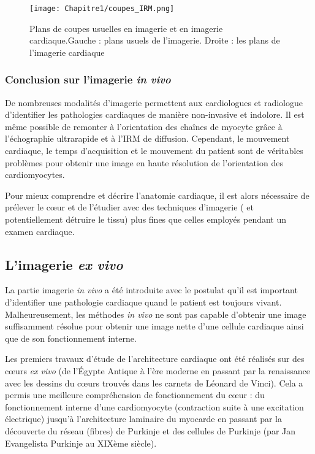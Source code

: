 \begin{figure}[!htbp]
  \begin{center}
    \texttt{[image: Chapitre1/coupes\_IRM.png]}
     \end{center}
    \caption{Plans de coupes usuelles en imagerie et en imagerie cardiaque.Gauche : plans usuels de l'imagerie. Droite : les plans de l'imagerie cardiaque}
  \label{fig:coupes_IRM}
\end{figure}

\subsubsection{Conclusion sur l’imagerie \textit{in vivo}}

De nombreuses modalités d’imagerie permettent aux cardiologues et radiologue d’identifier les pathologies cardiaques de manière non-invasive et indolore. Il est même possible de remonter à l’orientation des chaînes de myocyte grâce à l’échographie ultrarapide et à l’IRM de diffusion. Cependant, le mouvement cardiaque, le temps d’acquisition et le mouvement du patient sont de véritables problèmes pour obtenir une image en haute résolution de l’orientation des cardiomyocytes.

Pour mieux comprendre et décrire l’anatomie cardiaque, il est alors nécessaire de prélever le cœur et de l’étudier avec des techniques d’imagerie ( et potentiellement détruire le tissu) plus fines que celles employés pendant un examen cardiaque.

\subsection{L’imagerie \textit{ex vivo}}

La partie imagerie \textit{in vivo} a été introduite avec le postulat qu’il est important d’identifier une pathologie cardiaque quand le patient est toujours vivant. Malheureusement, les méthodes \textit{in vivo} ne sont pas capable d’obtenir une image suffisamment résolue pour obtenir une image nette d’une cellule cardiaque ainsi que de son fonctionnement interne.

Les premiers travaux d’étude de l’architecture cardiaque ont été réalisés sur des cœurs \textit{ex vivo} (de l’Égypte Antique à l’ère moderne en passant par la renaissance avec les dessins du cœurs trouvés dans les carnets de Léonard de Vinci). Cela a permis une meilleure compréhension de fonctionnement du cœur : du fonctionnement interne d’une cardiomyocyte (contraction suite à une excitation électrique) jusqu’à l’architecture laminaire du myocarde en passant par la découverte du réseau (fibres) de Purkinje et des cellules de Purkinje (par Jan Evangelista Purkinje au XIXème siècle).

